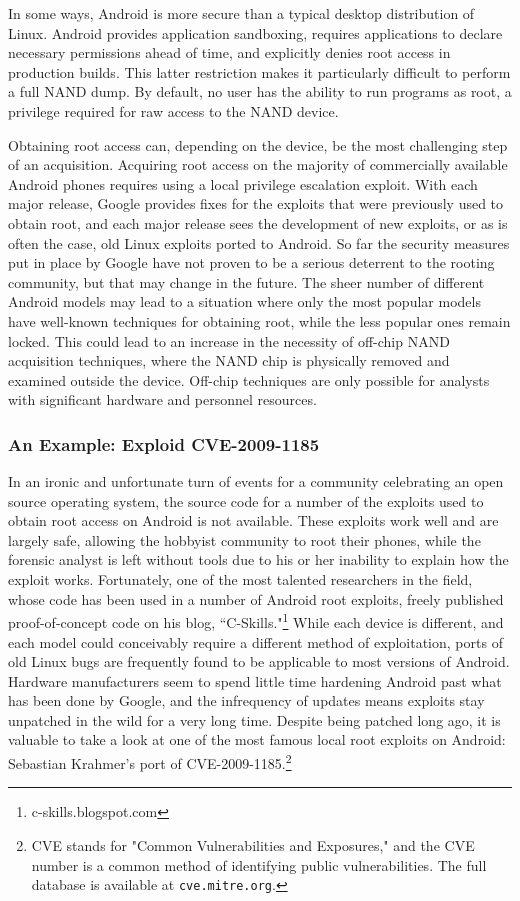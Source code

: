 In some ways, Android is more secure than a typical desktop distribution of Linux.  Android provides application sandboxing,
requires applications to declare necessary permissions ahead of time, and explicitly denies root access in production builds. This
latter restriction makes it particularly difficult to perform a full NAND dump.  By default, no user has the ability to run programs
as root, a privilege required for raw access to the NAND device.  

Obtaining root access can, depending on the device, be the most challenging step of an acquisition.  Acquiring root access on the
majority of commercially available Android phones requires using a local privilege escalation exploit.  With each major release,
Google provides fixes for the exploits that were previously used to obtain root, and each major release sees the development of new
exploits, or as is often the case, old Linux exploits ported to Android.  So far the security measures put in place by Google have
not proven to be a serious deterrent to the rooting community, but that may change in the future.  The sheer number of different
Android models may lead to a situation where only the most popular models have well-known techniques for obtaining root, while the
less popular ones remain locked.  This could lead to an increase in the necessity of off-chip NAND acquisition techniques, where the
NAND chip is physically removed and examined outside the device.  Off-chip techniques are only possible for analysts with
significant hardware and personnel resources.

\subsubsection{An Example: Exploid CVE-2009-1185}
In an ironic and unfortunate turn of events for a community celebrating an open source operating system, the source code for a
number of the exploits used to obtain root access on Android is not available.  These exploits work well and are largely safe,
allowing the hobbyist community to root their phones, while the forensic analyst is left without tools due to his or her inability
to explain how the exploit works.  Fortunately, one of the most talented researchers in the field, whose code has been used in a
number of Android root exploits, freely published proof-of-concept code on his blog, ``C-Skills."\footnote{c-skills.blogspot.com}
While each device is different, and each model could conceivably require a different method of exploitation, ports of old Linux bugs
are frequently found to be applicable to most versions of Android.  Hardware manufacturers seem to spend little time hardening
Android past what has been done by Google, and the infrequency of updates means exploits stay unpatched in the wild for a very long
time. Despite being patched long ago, it is valuable to take a look at one of the most famous local root exploits on Android:
Sebastian Krahmer's port of CVE-2009-1185.\footnote{CVE stands for "Common Vulnerabilities and Exposures," and the CVE number is a
common method of identifying public vulnerabilities. The full database is available at \texttt{cve.mitre.org}. }
 
